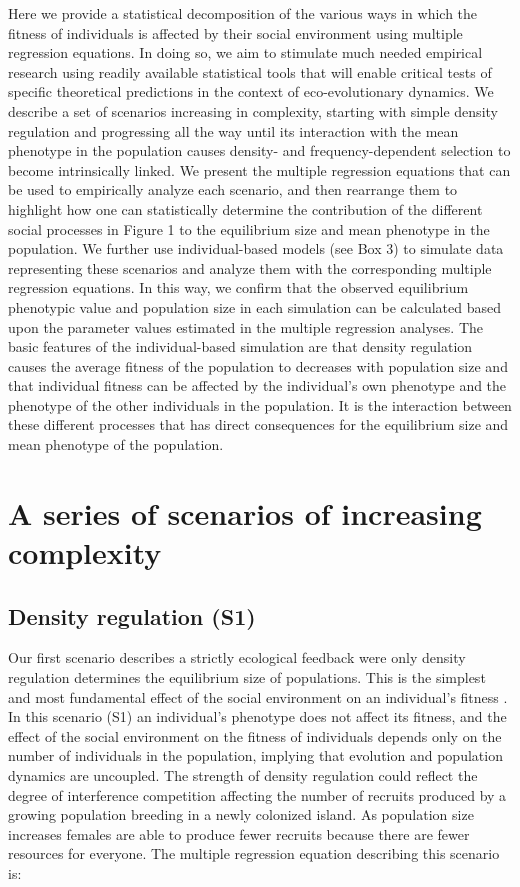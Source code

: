 \documentclass{article}
\begin{document}
Here we provide a statistical decomposition of the various ways in which the fitness of individuals is affected by their social environment using multiple regression equations. In doing so, we aim to stimulate much needed empirical research using readily available statistical tools that will enable critical tests of specific theoretical predictions in the context of eco-evolutionary dynamics. We describe a set of scenarios increasing in complexity, starting with simple density regulation and progressing all the way until its interaction with the mean phenotype in the population causes density- and frequency-dependent selection to become intrinsically linked. We present the multiple regression equations that can be used to empirically analyze each scenario, and then rearrange them to highlight how one can statistically determine the contribution of the different social processes in Figure 1 to the equilibrium size and mean phenotype in the population. We further use individual-based models (see Box 3) to simulate data representing these scenarios and analyze them with the corresponding multiple regression equations. In this way, we confirm that the observed equilibrium phenotypic value and population size in each simulation can be calculated based upon the parameter values estimated in the multiple regression analyses. The basic features of the individual-based simulation are that density regulation causes the average fitness of the population to decreases with population size and that individual fitness can be affected by the individual's own phenotype and the phenotype of the other individuals in the population. It is the interaction between these different processes that has direct consequences for the equilibrium size and mean phenotype of the population. 


\section{A series of scenarios of increasing complexity}
\subsection{Density regulation (S1)}
Our first scenario describes a strictly ecological feedback were only density regulation determines the equilibrium size of populations. This is the simplest and most fundamental effect of the social environment on an individual's fitness \citep{Brook2006}. In this scenario (S1) an individual's phenotype does not affect its fitness, and the effect of the social environment on the fitness of individuals depends only on the number of individuals in the population, implying that evolution and population dynamics are uncoupled. The strength of density regulation could reflect the degree of interference competition affecting the number of recruits produced by a growing population breeding in a newly colonized island. As population size increases females are able to produce fewer recruits because there are fewer resources for everyone. The multiple regression equation describing this scenario is:
\end{document}
